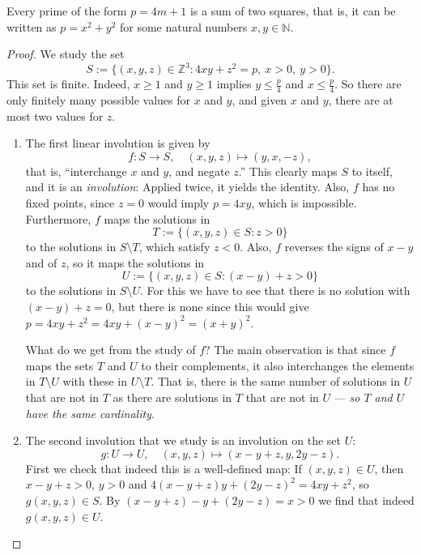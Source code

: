 \begin{proposition}
  \label{ch04.proposition2}
  \leanok
  Every prime of the form \(p = 4m + 1\) is a sum of two squares,
  that is, it can be written as \(p = x^2 + y^2\) for some natural numbers \(x,y \in \mathbb{N}\).
\end{proposition}
\begin{proof}
 We study the set
\[
S := \{(x, y, z) \in \mathbb{Z}^3 : 4xy + z^2 = p, \ x > 0, \ y > 0\}.
\]
This set is finite. Indeed, $x \geq 1$ and $y \geq 1$ implies $y \leq \frac{p}{4}$ and
$x \leq \frac{p}{4}$. So there are only finitely many possible values for $x$ and $y$, and given
$x$ and $y$, there are at most two values for $z$.

\begin{enumerate}
    \item The first linear involution is given by
    \[
    f : S \to S, \quad (x, y, z) \mapsto (y, x, -z),
    \]
    that is, ``interchange $x$ and $y$, and negate $z$.'' This clearly maps $S$ to itself, and it is
    an \emph{involution}: Applied twice, it yields the identity. Also, $f$ has no fixed points,
    since $z = 0$ would imply $p = 4xy$, which is impossible. Furthermore, $f$ maps the solutions in
    \[
    T := \{(x, y, z) \in S : z > 0\}
    \]
    to the solutions in $S \setminus T$, which satisfy $z < 0$. Also, $f$ reverses the signs of
    $x - y$ and of $z$, so it maps the solutions in
    \[
    U := \{(x, y, z) \in S : (x - y) + z > 0\}
    \]
    to the solutions in $S \setminus U$. For this we have to see that there is no solution with
    $(x - y) + z = 0$, but there is none since this would give
    $p = 4xy + z^2 = 4xy + (x - y)^2 = (x + y)^2$.

    What do we get from the study of $f$? The main observation is that since $f$ maps the sets $T$
    and $U$ to their complements, it also interchanges the elements in $T \setminus U$ with these in
    $U \setminus T$. That is, there is the same number of solutions in $U$ that are not in $T$ as
    there are solutions in $T$ that are not in $U$ --- \emph{so $T$ and $U$ have the same cardinality}.

    \item The second involution that we study is an involution on the set $U$:
    \[
    g : U \to U, \quad (x, y, z) \mapsto (x - y + z, y, 2y - z).
    \]
    First we check that indeed this is a well-defined map: If $(x, y, z) \in U$, then
    $x - y + z > 0$, $y > 0$ and $4(x - y + z)y + (2y - z)^2 = 4xy + z^2$, so $g(x, y, z) \in S$.
    By $(x - y + z) - y + (2y - z) = x > 0$ we find that indeed $g(x, y, z) \in U$.


\end{enumerate}
\end{proof}
